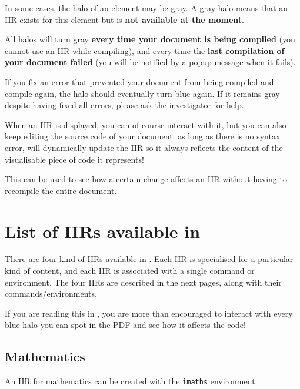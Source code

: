 \documentclass[11pt, a4paper]{article}
\begin{document}
\begin{warning}
    In some cases, the halo of an element may be gray.
    A gray halo means that an IIR exists for this element but is \textbf{not available at the moment}.
    
    All halos will turn gray \textbf{every time your document is being compiled} (you cannot use an IIR while compiling), and every time the \textbf{last compilation of your document failed} (you will be notified by a popup message when it fails).
   
    If you fix an error that prevented your document from being compiled and compile again, the halo should eventually turn blue again.
    If it remains gray despite having fixed all errors, please ask the investigator for help.
\end{warning}

\begin{info}
    When an IIR is displayed, you can of course interact with it, but you can also keep editing the source code of your document: as long as there is no syntax error, \iLaTeX{} will dynamically update the IIR so it always reflects the content of the visualisable piece of code it represents!
    
    This can be used to see how a certain change affects an IIR without having to recompile the entire document.
\end{info}




\section{List of IIRs available in \iLaTeX{}}
There are four kind of IIRs available in \iLaTeX{}.
Each IIR is specialised for a particular kind of content, and each IIR is associated with a single command or environment.
The four IIRs are described in the next pages, along with their commands/environments.

If you are reading this in \iLaTeX{}, you are more than encouraged to interact with every blue halo you can spot in the PDF and see how it affects the code!




\newpage
\subsection{Mathematics}

An IIR for mathematics can be created with the \texttt{imaths} environment:
\end{document}
